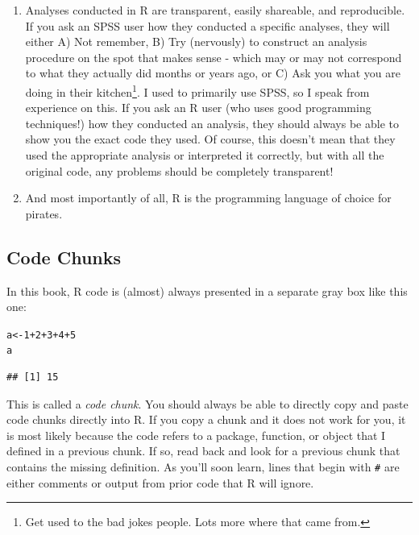 \documentclass{tufte-book}\usepackage[]{graphicx}\usepackage[]{color}
\makeatletter
\newcommand{\hlnum}[1]{\textcolor[rgb]{0.686,0.059,0.569}{#1}}%
\newcommand{\hlopt}[1]{\textcolor[rgb]{0,0,0}{#1}}%
\newcommand{\hlstd}[1]{\textcolor[rgb]{0.345,0.345,0.345}{#1}}%
\newcommand{\hlkwb}[1]{\textcolor[rgb]{0.69,0.353,0.396}{#1}}%
\newenvironment{kframe}{%
 \def\at@end@of@kframe{}%
 \ifinner\ifhmode%
  \def\at@end@of@kframe{\end{minipage}}%
  \begin{minipage}{\columnwidth}%
 \fi\fi%
 \def\FrameCommand##1{\hskip\@totalleftmargin \hskip-\fboxsep
 \colorbox{shadecolor}{##1}\hskip-\fboxsep
     \hskip-\linewidth \hskip-\@totalleftmargin \hskip\columnwidth}%
 \MakeFramed {\advance\hsize-\width
   \@totalleftmargin\z@ \linewidth\hsize
   \@setminipage}}%
 {\par\unskip\endMakeFramed%
 \at@end@of@kframe}
\newenvironment{knitrout}{}{} %
\makeatother
\begin{document}
\begin{enumerate}
\item Analyses conducted in R are transparent, easily shareable, and reproducible. If you ask an SPSS user how they conducted a specific analyses, they will either A) Not remember,  B) Try (nervously) to construct an analysis procedure on the spot that makes sense - which may or may not correspond to what they actually did months or years ago, or C) Ask you what you are doing in their kitchen\footnote{Get used to the bad jokes people. Lots more where that came from.}. I used to primarily use SPSS, so I speak from experience on this. If you ask an R user (who uses good programming techniques!) how they conducted an analysis, they should always be able to show you the exact code they used. Of course, this doesn't mean that they used the appropriate analysis or interpreted it correctly, but with all the original code, any problems should be completely transparent!

\item And most importantly of all, R is the programming language of choice for pirates.

\end{enumerate}

\subsection{Code Chunks}

In this book, R code is (almost) always presented in a separate gray box like this one:


\begin{knitrout}
\color{fgcolor}\begin{kframe}
\begin{alltt}
\hlstd{a} \hlkwb{<-} \hlnum{1} \hlopt{+} \hlnum{2} \hlopt{+} \hlnum{3} \hlopt{+} \hlnum{4} \hlopt{+} \hlnum{5}
\hlstd{a}
\end{alltt}
\begin{verbatim}
## [1] 15
\end{verbatim}
\end{kframe}
\end{knitrout}

This is called a \textit{code chunk}. You should always be able to directly copy and paste code chunks directly into R. If you copy a chunk and it does not work for you, it is most likely because the code refers to a package, function, or object that I defined in a previous chunk. If so, read back and look for a previous chunk that contains the missing definition. As you'll soon learn, lines that begin with \texttt{\#} are either comments or output from prior code that R will ignore.
\end{document}
